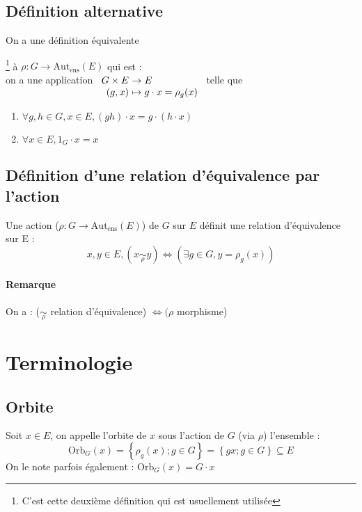 \documentclass[a4paper,10pt]{report}
\newcommand{\set}[1]{\left\lbrace #1 \right\rbrace } %
\newcommand{\mfootnote}[1]{\up{(}\footnote{#1}\up{)}}
\newcommand{\Autens}[1]{\text{Aut}_{\text{ens}}\left(#1\right)}
\newcommand{\Orb}[2]{\text{Orb}_{#1}\left( #2 \right)}
\begin{document}
   \subsection{Définition alternative}
    On a une définition équivalente
    \begin{comment}
      \mfootnote{Preuve de l'équivalence :26/11/08 p1, verso}
    \end{comment}
    \mfootnote{C'est cette deuxième définition qui est usuellement
    utilisée} à $\rho : G \to \Autens{E}$ qui est :\\
    on a une application
    $\begin{array}[t]{r@{\ }l}
      G \times E & \to E\\
      (g, x) & \mapsto g \cdot x = \rho_g(x)
    \end{array}$
    telle que
    \begin{enumerate}
      \item $\forall g,h \in G, x \in E, (gh)\cdot x = g \cdot
        (h \cdot x)$
      \item $\forall x \in E, 1_G \cdot x = x$ 
    \end{enumerate}

   \subsection{Définition d'une relation d'équivalence par l'action}
    Une action ($\rho: G \to \Autens{E}$) de $G$ sur $E$ définit une relation
    d'équivalence sur E : 
    $$x,y \in E, \left(x \underset{\rho}{\sim} y \right) \iff
    \left( \exists g \in G, y=\rho_g(x)\right)$$

    \paragraph{Remarque} On a : ($\underset{\rho}{\sim}$ relation d'équivalence)
    $\iff (\rho$ morphisme)

  \section{Terminologie}
   \subsection{Orbite}
    Soit $x \in E$, on appelle l'orbite de $x$ sous l'action de $G$
    (via $\rho$) l'ensemble :
    $$\Orb{G}{x}=\set{\rho_g(x); g \in G} = \set{gx;g \in G} \subseteq E$$
    On le note parfois également : $\Orb{G}{x}=G\cdot x$
\end{document}
